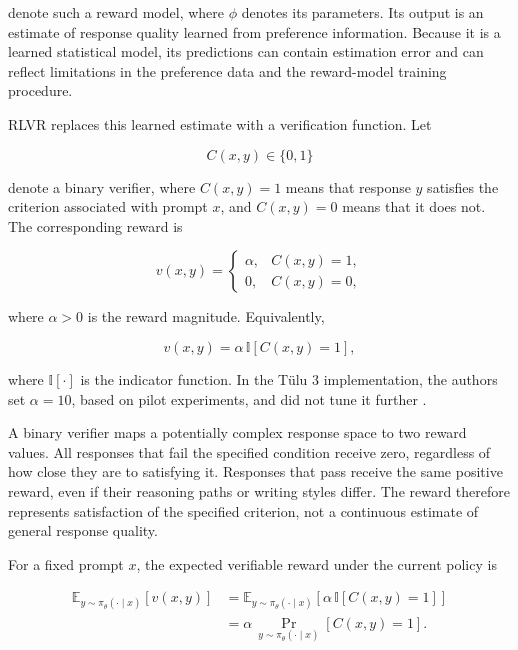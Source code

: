 denote such a reward model, where \(\phi\) denotes its parameters. Its output
is an estimate of response quality learned from preference information.
Because it is a learned statistical model, its predictions can contain
estimation error and can reflect limitations in the preference data and the
reward-model training procedure.

RLVR replaces this learned estimate with a verification function. Let

\begin{equation}
    C(x,y)\in\{0,1\}
    \label{eq:rlvr-verifier}
\end{equation}

denote a binary verifier, where \(C(x,y)=1\) means that response \(y\)
satisfies the criterion associated with prompt \(x\), and \(C(x,y)=0\)
means that it does not. The corresponding reward is

\begin{equation}
    v(x,y)
    =
    \begin{cases}
        \alpha, & C(x,y)=1,\\
        0,      & C(x,y)=0,
    \end{cases}
    \label{eq:rlvr-binary-reward}
\end{equation}

where \(\alpha>0\) is the reward magnitude. Equivalently,

\begin{equation}
    v(x,y)=\alpha\,\mathbb{I}[C(x,y)=1],
    \label{eq:rlvr-indicator-reward}
\end{equation}

where \(\mathbb{I}[\cdot]\) is the indicator function. In the Tülu 3
implementation, the authors set \(\alpha=10\), based on pilot experiments,
and did not tune it further \parencite{lambert2025tulu3}.

A binary verifier maps a potentially complex response space to two reward
values. All responses that fail the specified condition receive zero,
regardless of how close they are to satisfying it. Responses that pass
receive the same positive reward, even if their reasoning paths or writing
styles differ. The reward therefore represents satisfaction of the
specified criterion, not a continuous estimate of general response quality.

For a fixed prompt \(x\), the expected verifiable reward under the current
policy is

\begin{align}
    \mathbb{E}_{y\sim\pi_\theta(\cdot\mid x)}
    [v(x,y)]
    &=
    \mathbb{E}_{y\sim\pi_\theta(\cdot\mid x)}
    \left[
        \alpha\,\mathbb{I}[C(x,y)=1]
    \right]
    \nonumber\\
    &=
    \alpha\,
    \Pr_{y\sim\pi_\theta(\cdot\mid x)}
    [C(x,y)=1].
    \label{eq:rlvr-expected-reward}
\end{align}

